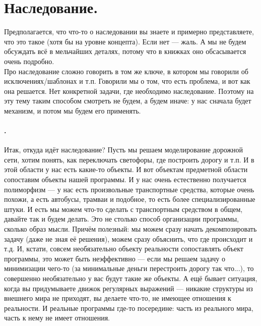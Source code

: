 \documentclass{article}
\begin{document}
    \section{Наследование.}
    Предполагается, что что-то о наследовании вы знаете и примерно представляете, что это такое (хотя бы на уровне концепта). Если нет --- жаль. А мы не будем обсуждать всё в мельчайших деталях, потому что в книжках оно обсасывается очень подробно.\\
    Про наследование сложно говорить в том же ключе, в котором мы говорили об исключениях/шаблонах и т.п. Говорили мы о том, что есть проблема, и вот как она решается. Нет конкретной задачи, где необходимо наследование. Поэтому на эту тему таким способом смотреть не будем, а будем иначе: у нас сначала будет механизм, и потом мы будем его применять.
    \paragraph{.}
    Итак, откуда идёт наследование? Пусть мы решаем моделирование дорожной сети, хотим понять, как переключать светофоры, где построить дорогу и т.п. И в этой области у нас есть какие-то объекты. И вот объектам предметной области сопоставим объекты нашей программы. И у нас очень естественно получается полиморфизм --- у нас есть произвольные транспортные средства, которые очень похожи, а есть автобусы, трамваи и подобное, то есть более специализированные штуки. И есть мы можем что-то сделать с транспортным средством в общем, давайте так и будем делать. Это не столько способ организации программы, сколько образ мысли. Причём полезный: мы можем сразу начать декомпозировать задачу (даже не зная её решения), можем сразу объяснить, что где происходит и т.д. И, кстати, совсем необязательно объекту реальности сопоставлять объект программы, это может быть неэффективно --- если мы решаем задачу о минимизации чего-то (за минимальные деньги перестроить дорогу так что...), то совершенно необязательно у вас будут такие же объекты. А ещё бывает ситуация, когда вы придумываете движок регулярных выражений --- никакие структуры из внешнего мира не приходят, вы делаете что-то, не имеющее отношения к реальности. И реальные программы где-то посередине: часть из реального мира, часть к нему не имеет отношения.
\end{document}
